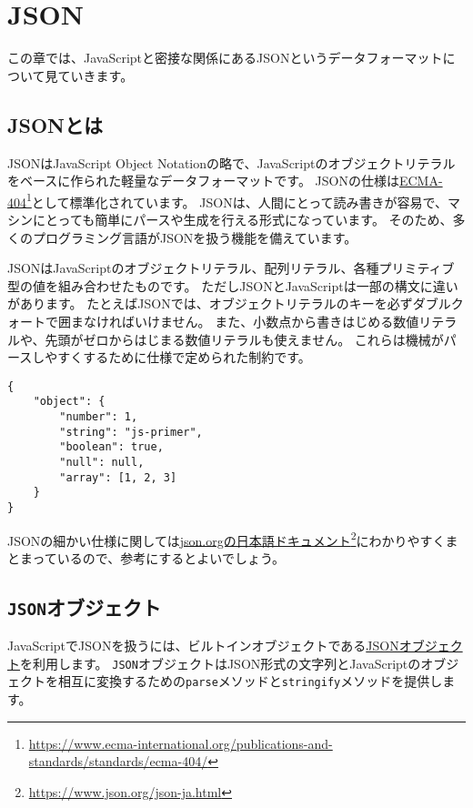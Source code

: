 \hypertarget{json}{%
\chapter{JSON}\label{json}}
\thispagestyle{frontheadings}

この章では、JavaScriptと密接な関係にあるJSONというデータフォーマットについて見ていきます。

\hypertarget{what-is-json}{%
\section{JSONとは}\label{what-is-json}}

JSONはJavaScript Object
Notationの略で、JavaScriptのオブジェクトリテラルをベースに作られた軽量なデータフォーマットです。
JSONの仕様は\href{https://www.ecma-international.org/publications-and-standards/standards/ecma-404/}{ECMA-404}\footnote{\url{https://www.ecma-international.org/publications-and-standards/standards/ecma-404/}}として標準化されています。
JSONは、人間にとって読み書きが容易で、マシンにとっても簡単にパースや生成を行える形式になっています。
そのため、多くのプログラミング言語がJSONを扱う機能を備えています。

JSONはJavaScriptのオブジェクトリテラル、配列リテラル、各種プリミティブ型の値を組み合わせたものです。
ただしJSONとJavaScriptは一部の構文に違いがあります。
たとえばJSONでは、オブジェクトリテラルのキーを必ずダブルクォートで囲まなければいけません。
また、小数点から書きはじめる数値リテラルや、先頭がゼロからはじまる数値リテラルも使えません。
これらは機械がパースしやすくするために仕様で定められた制約です。

\begin{lstlisting}
{
    "object": { 
        "number": 1, 
        "string": "js-primer",
        "boolean": true,
        "null": null,
        "array": [1, 2, 3]
    }
}
\end{lstlisting}

JSONの細かい仕様に関しては\href{https://www.json.org/json-ja.html}{json.orgの日本語ドキュメント}\footnote{\url{https://www.json.org/json-ja.html}}にわかりやすくまとまっているので、参考にするとよいでしょう。

\hypertarget{json-object}{%
\section{\texorpdfstring{\texttt{JSON}オブジェクト}{JSONオブジェクト}}\label{json-object}}

JavaScriptでJSONを扱うには、ビルトインオブジェクトである\href{https://developer.mozilla.org/ja/docs/Web/JavaScript/Reference/Global_Objects/JSON}{JSONオブジェクト}を利用します。
\texttt{JSON}オブジェクトはJSON形式の文字列とJavaScriptのオブジェクトを相互に変換するための\texttt{parse}メソッドと\texttt{stringify}メソッドを提供します。

